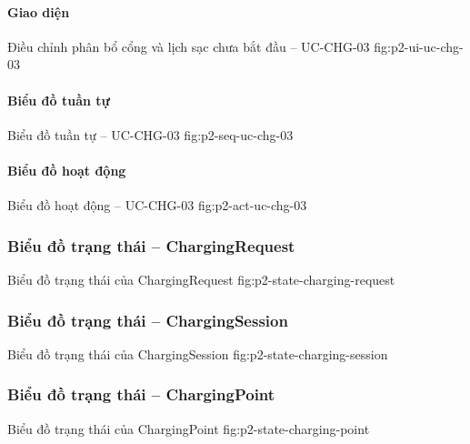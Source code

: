 \par\medskip
\noindent\begin{minipage}{\linewidth}
\paragraph{Giao diện}
  {Điều chỉnh phân bổ cổng và lịch sạc chưa bắt đầu -- UC-CHG-03}
  {fig:p2-ui-uc-chg-03}
  {}
\end{minipage}\par

\clearpage
\paragraph{Biểu đồ tuần tự}
  {Biểu đồ tuần tự -- UC-CHG-03}
  {fig:p2-seq-uc-chg-03}

\clearpage
\paragraph{Biểu đồ hoạt động}
  {Biểu đồ hoạt động -- UC-CHG-03}
  {fig:p2-act-uc-chg-03}

\clearpage

\subsubsection{Biểu đồ trạng thái -- ChargingRequest}

  {Biểu đồ trạng thái của ChargingRequest}
  {fig:p2-state-charging-request}

\clearpage

\subsubsection{Biểu đồ trạng thái -- ChargingSession}

  {Biểu đồ trạng thái của ChargingSession}
  {fig:p2-state-charging-session}

\clearpage

\subsubsection{Biểu đồ trạng thái -- ChargingPoint}

  {Biểu đồ trạng thái của ChargingPoint}
  {fig:p2-state-charging-point}

\clearpage
